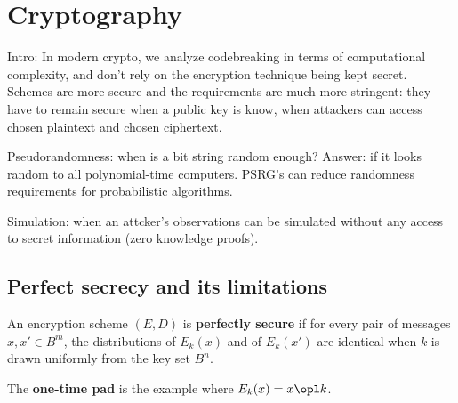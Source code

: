 \section{Cryptography}


Intro: In modern crypto, we analyze codebreaking in terms of computational complexity, and don't rely on the encryption technique being kept secret. Schemes are more secure and the requirements are much more stringent: they have to remain secure when a public key is know, when attackers can access chosen plaintext and chosen ciphertext.

Pseudorandomness: when is a bit string random enough? Answer: if it looks random to all polynomial-time computers. PSRG's can reduce randomness requirements for probabilistic algorithms.

Simulation: when an attcker's observations can be simulated without any access to secret information (zero knowledge proofs).

\subsection{Perfect secrecy and its limitations}

\begin{df}
An encryption scheme $(E,D)$ is \textbf{perfectly secure} if for every pair of messages $x,x'\in B^m$, the distributions of $E_k(x)$ and of $E_k(x')$ are identical when $k$ is drawn uniformly from the key set $B^n$.

The \textbf{one-time pad} is the example where $E_k(x)=x\opl k$.
\end{df}

